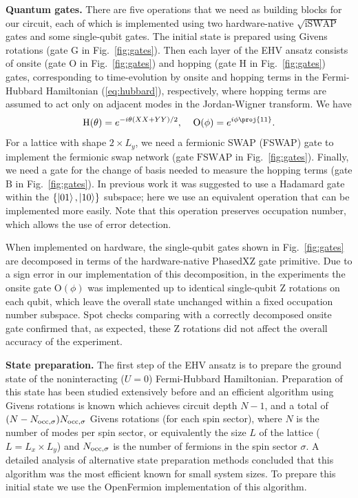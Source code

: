 \documentclass[aps,prb,twoside,superscriptaddress,longbibliography,nofootinbib,floatfix, notitlepage,twocolumn]{revtex4-1}
\newcommand{\Noccsigma}{N_{\rm{occ},\sigma}}
\begin{document}
\textbf{Quantum gates.} There are five operations that we need as building blocks for our circuit, each of which is implemented using two hardware-native $\sqrt{\mathrm{iSWAP}}$ gates and some single-qubit gates.
The initial state is prepared using Givens rotations (gate $\mathrm{G}$ in Fig.~\ref{fig:gates}).
Then each layer of the EHV ansatz consists of onsite (gate $\mathrm{O}$ in Fig.~\ref{fig:gates}) and hopping (gate $\mathrm{H}$ in Fig.~\ref{fig:gates}) gates, corresponding to time-evolution by onsite and hopping terms in the Fermi-Hubbard Hamiltonian (\ref{eq:hubbard}), respectively, where hopping terms are assumed to act only on adjacent modes in the Jordan-Wigner transform. We have
%
\[ \mathrm{H}(\theta) = e^{-i\theta(XX+YY)/2},\;\;\;\; \mathrm{O}(\phi) = e^{i\phi \proj{11}}. \]
%
For a lattice with shape $2 \times L_y$, we need a fermionic SWAP (FSWAP) gate to implement the fermionic swap network (gate $\mathrm{FSWAP}$ in Fig.~\ref{fig:gates}).
Finally, we need a gate for the change of basis needed to measure the hopping terms (gate $\mathrm{B}$ in Fig.~\ref{fig:gates}). In previous work it was suggested to use a Hadamard gate within the $\{\ket{01},\ket{10}\}$ subspace\cite{cade20}; here we use an equivalent operation that can be implemented more easily. Note that this operation preserves occupation number, which allows the use of error detection.

When implemented on hardware, the single-qubit gates shown in Fig.~\ref{fig:gates} are decomposed in terms of the hardware-native PhasedXZ gate primitive. Due to a sign error in our implementation of this decomposition, in the experiments the onsite gate $\mathrm{O}(\phi)$ was implemented up to identical single-qubit Z rotations on each qubit, which leave the overall state unchanged within a fixed occupation number subspace. Spot checks comparing with a correctly decomposed onsite gate confirmed that, as expected, these Z rotations did not affect the overall accuracy of the experiment.

\textbf{State preparation.} The first step of the EHV ansatz is to prepare the ground state of the noninteracting ($U=0$) Fermi-Hubbard Hamiltonian. Preparation of this state has been studied extensively before and an efficient algorithm using Givens rotations is known\cite{jiang2018quantum} which achieves circuit depth $N-1$, and a total of $(N - \Noccsigma) \Noccsigma$ Givens rotations (for each spin sector), where $N$ is the number of modes per spin sector, or equivalently the size $L$ of the lattice ($L=L_x \times L_y$) and $\Noccsigma$ is the number of fermions in the spin sector $\sigma$. A detailed analysis of alternative state preparation methods\cite{cade20} concluded that this algorithm was the most efficient known for small system sizes.
To prepare this initial state we use the OpenFermion\cite{mcclean20} implementation of this algorithm.
\end{document}
